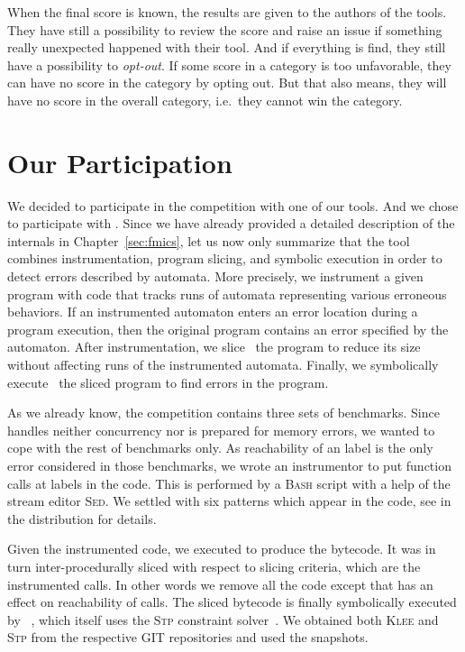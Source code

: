 When the final score is known, the results are given to the authors of the
tools. They have still a possibility to review the score and raise an issue
if something really unexpected happened with their tool.  And if everything is
find, they still have a possibility to \emph{opt-out}. If some score in a
category is too unfavorable, they can have no score in the category by opting
out. But that also means, they will have no score in the overall category,
i.e.\ they cannot win the category.

\section{Our Participation}\label{sec:svcomp_participation}

We decided to participate in the competition with one of our tools. And we
chose to participate with \symbio. Since we have already provided a detailed
description of the \symbio internals in Chapter~\ref{sec:fmics}, let us now only
summarize that the tool combines instrumentation, program slicing, and
symbolic execution in order to detect errors described by automata. More
precisely, we instrument a given program with code that tracks runs of
automata representing various erroneous behaviors. If an instrumented
automaton enters an error location during a program execution, then the
original program contains an error specified by the automaton. After
instrumentation, we slice~\cite{slicing} the program to reduce its size
without affecting runs of the instrumented automata.  Finally, we symbolically
execute~\cite{se_king} the sliced program to find errors in the program.

As we already know, the competition contains three sets of benchmarks. Since
\symbio handles neither concurrency nor is prepared for memory errors, we
wanted to cope with the rest of benchmarks only. As reachability of an
 label is the only error considered in those benchmarks, we wrote
an instrumentor to put  function calls at  labels
in the code.  This is performed by a \textsc{Bash} script with a help of the
stream editor \textsc{Sed}. We settled with six patterns which appear in the
code, see  in the \symbio distribution for details.

Given the instrumented code, we executed  to produce the \llvm
bytecode. It was in turn inter-procedurally sliced with respect to slicing
criteria, which are the instrumented  calls. In other words we
remove all the code except that has an effect on reachability of 
calls. The sliced \llvm bytecode is finally symbolically executed by
\klee~\cite{klee}, which itself uses the \textsc{Stp} constraint
solver~\cite{stp}. We obtained both \textsc{Klee} and \textsc{Stp} from the
respective GIT repositories and used the snapshots.

